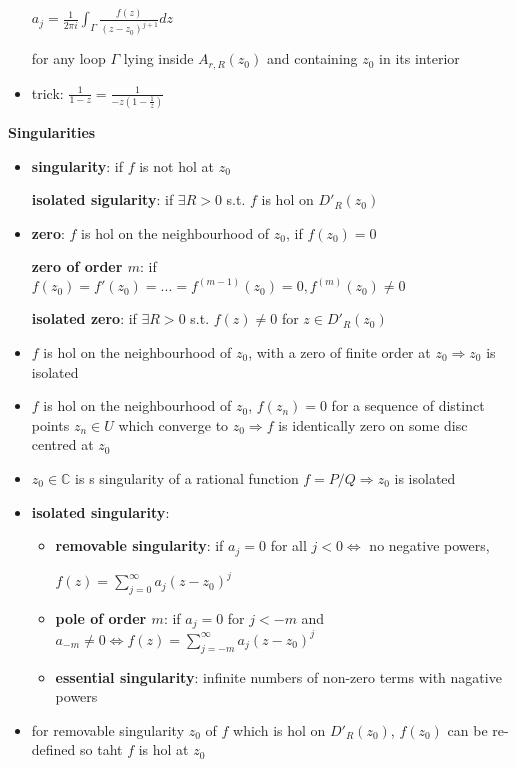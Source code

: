 \documentclass[10pt,a4paper]{article}
\begin{document}
\begin{multicols}{2}
\begin{itemize}
    $\displaystyle a_j= \frac{1}{2\pi i} \int_\Gamma \frac{f(z)}{(z-z_0)^{j+1}}dz$
    
      for any loop $\Gamma$ lying inside $A_{r,R}(z_0)$ and containing $z_0$ in its interior
    \item trick: $\displaystyle \frac{1}{1-z}=\frac{1}{-z(1-\frac{1}{z})}$
\end{itemize}

\textbf{Singularities}

\begin{itemize}
    \item \textbf{singularity}: if $f$ is not hol at $z_0$
  
    \textbf{isolated sigularity}: if $\exists R>0$ s.t. $f$ is hol on $D'_R(z_0)$ 
  \item \textbf{zero}: $f$ is hol on the neighbourhood of $z_0$, if $f(z_0)=0$
    
    \textbf{zero of order $m$}: if $f(z_0)=f'(z_0)=...=f^{(m-1)}(z_0)=0, f^{(m)}(z_0)\neq 0$
  
    \textbf{isolated zero}: if $\exists R>0$ s.t. $f(z)\neq 0$ for $z \in D'_R(z_0)$ 
  \item $f$ is hol on the neighbourhood of $z_0$, with a zero of finite order at $z_0 \Rightarrow z_0$ is isolated
  \item $f$ is hol on the neighbourhood of $z_0$, $f(z_n)=0$ for a sequence of distinct points $z_n \in U$ which converge to $z_0 \Rightarrow f$ is identically zero on some disc centred at $z_0$
  \item $z_0 \in \mathbb C$ is s singularity of a rational function $f=P/Q \Rightarrow z_0$ is isolated
  \item \textbf{isolated singularity}:
    \begin{itemize}
        \item \textbf{removable singularity}: if $a_j=0$ for all $j<0 \Leftrightarrow$ no negative powers, 
        
        $f(z)=\sum_{j=0}^\infty a_j(z-z_0)^j$
  
        \item \textbf{pole of order $m$}: if $a_j=0$ for $j<-m$ and $a_{-m}\neq 0 \Leftrightarrow f(z)=\sum_{j=-m}^\infty a_j(z-z_0)^j$
      
        \item \textbf{essential singularity}: infinite numbers of non-zero terms with nagative powers
    \end{itemize}    

  \item for removable singularity $z_0$ of $f$ which is hol on $D'_R(z_0)$, $f(z_0)$ can be re-defined so taht $f$ is hol at $z_0$
    

\end{itemize}
\end{multicols}
\end{document}
